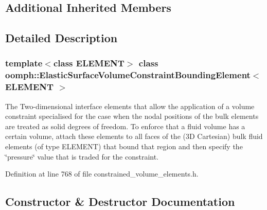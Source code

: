 \subsection*{Additional Inherited Members}


\subsection{Detailed Description}
\subsubsection*{template$<$class E\+L\+E\+M\+E\+NT$>$\newline
class oomph\+::\+Elastic\+Surface\+Volume\+Constraint\+Bounding\+Element$<$ E\+L\+E\+M\+E\+N\+T $>$}

The Two-\/dimensional interface elements that allow the application of a volume constraint specialised for the case when the nodal positions of the bulk elements are treated as solid degrees of freedom. To enforce that a fluid volume has a certain volume, attach these elements to all faces of the (3D Cartesian) bulk fluid elements (of type E\+L\+E\+M\+E\+NT) that bound that region and then specify the \char`\"{}pressure\char`\"{} value that is traded for the constraint. 

Definition at line 768 of file constrained\+\_\+volume\+\_\+elements.\+h.



\subsection{Constructor \& Destructor Documentation}
\mbox{\label{classoomph_1_1ElasticSurfaceVolumeConstraintBoundingElement_a22e5cb7f3cb0d363301ae8ef232dd6cb}} 

